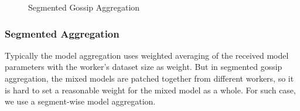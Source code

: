 %

\begin{figure}[H]
\centering 
{}
\caption{Segmented Gossip Aggregation}
\label{Fig: Segmented schema}
\end{figure}

\subsubsection{Segmented Aggregation}
Typically the model aggregation uses weighted averaging of the received model parameters with the worker's dataset size as weight. But in segmented gossip aggregation, the mixed models are patched together from different workers, so it is hard to set a reasonable weight for the mixed model as a whole. For such case, we use a segment-wise model aggregation. 

